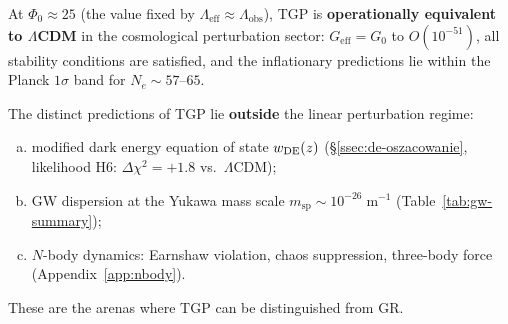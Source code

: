 \begin{remark}%
\label{rem:perturbation-conclusion}
At $\Phi_0 \approx 25$ (the value fixed by
$\Lambda_{\mathrm{eff}} \approx \Lambda_{\mathrm{obs}}$),
TGP is \textbf{operationally equivalent to $\Lambda$CDM}
in the cosmological perturbation sector:
$G_{\mathrm{eff}} = G_0$ to $O(10^{-51})$,
all stability conditions are satisfied,
and the inflationary predictions lie within the
Planck $1\sigma$ band for $N_e \sim 57$--$65$.

The distinct predictions of TGP lie
\textbf{outside} the linear perturbation regime:
\begin{enumerate}[(a),nosep]
  \item modified dark energy equation of state $w_{\rm DE}(z)$
    (\S\ref{ssec:de-oszacowanie}, likelihood H6:
    $\Delta\chi^2 = +1.8$ vs.\ $\Lambda$CDM);
  \item GW dispersion at the Yukawa mass scale
    $m_{\mathrm{sp}} \sim 10^{-26}\;\mathrm{m}^{-1}$
    (Table~\ref{tab:gw-summary});
  \item $N$-body dynamics: Earnshaw violation, chaos
    suppression, three-body force (Appendix~\ref{app:nbody}).
\end{enumerate}
These are the arenas where TGP can be distinguished from GR.
\end{remark}

